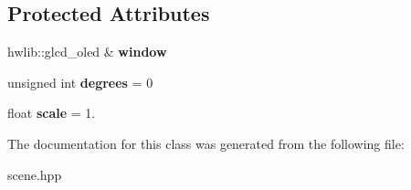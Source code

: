 \subsection*{Protected Attributes}
\begin{DoxyCompactItemize}
\item 
\mbox{\label{class_graphics_object_a0e49dd99a0687a72c72f47d04e572af6}} 
hwlib\+::glcd\+\_\+oled \& {\bfseries window}
\item 
\mbox{\label{class_graphics_object_a458673ac1ed2d83080ca5749790c2bc1}} 
unsigned int {\bfseries degrees} = 0
\item 
\mbox{\label{class_graphics_object_af5e6a5ff6615592178c41495fd36f350}} 
float {\bfseries scale} = 1.
\end{DoxyCompactItemize}


The documentation for this class was generated from the following file\+:\begin{DoxyCompactItemize}
\item 
scene.\+hpp\end{DoxyCompactItemize}
